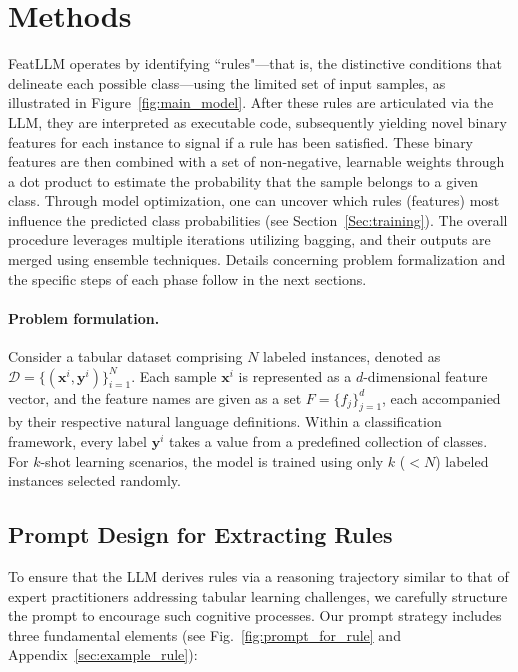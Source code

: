 \section{Methods}
\textsf{FeatLLM} operates by identifying ``rules"—that is, the distinctive conditions that delineate each possible class—using the limited set of input samples, as illustrated in Figure~\ref{fig:main_model}. After these rules are articulated via the LLM, they are interpreted as executable code, subsequently yielding novel binary features for each instance to signal if a rule has been satisfied. These binary features are then combined with a set of non-negative, learnable weights through a dot product to estimate the probability that the sample belongs to a given class. Through model optimization, one can uncover which rules (features) most influence the predicted class probabilities (see Section~\ref{Sec:training}). The overall procedure leverages multiple iterations utilizing bagging, and their outputs are merged using ensemble techniques. Details concerning problem formalization and the specific steps of each phase follow in the next sections.

\vspace*{-0.12in}
\paragraph{Problem formulation.} Consider a tabular dataset comprising $N$ labeled instances, denoted as $\mathcal{D} = \{(\mathbf{x}^i, \mathbf{y}^i)\}_{i=1}^{N}$. Each sample $\mathbf{x}^i$ is represented as a $d$-dimensional feature vector, and the feature names are given as a set $F = \{f_j\}_{j=1}^{d}$, each accompanied by their respective natural language definitions. Within a classification framework, every label $\mathbf{y}^i$ takes a value from a predefined collection of classes. For $k$-shot learning scenarios, the model is trained using only $k$ ($<N$) labeled instances selected randomly.

\subsection{Prompt Design for Extracting Rules}
\label{Sec:prompt_design}
To ensure that the LLM derives rules via a reasoning trajectory similar to that of expert practitioners addressing tabular learning challenges, we carefully structure the prompt to encourage such cognitive processes. Our prompt strategy includes three fundamental elements (see Fig.~\ref{fig:prompt_for_rule} and Appendix~\ref{sec:example_rule}):

